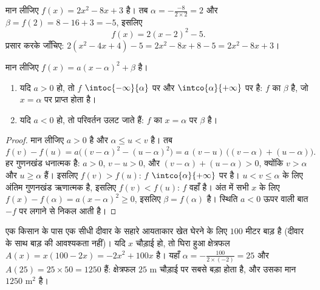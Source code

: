 \begin{example}\label{ex:g11:quad:canonical}
मान लीजिए $f(x) = 2x^2 - 8x + 3$ है। तब $\alpha = -\frac{-8}{2 \times 2} = 2$ और $\beta = f(2) = 8 - 16 + 3 = -5$, इसलिए
\[
f(x) = 2(x - 2)^2 - 5 .
\]
प्रसार करके जाँचिए: $2(x^2 - 4x + 4) - 5 = 2x^2 - 8x + 8 - 5 =
2x^2 - 8x + 3$।
\end{example}

\begin{proposition}[चरम मान और परिवर्तन]\label{prop:g11:quad:variations}
मान लीजिए $f(x) = a(x-\alpha)^2 + \beta$ है।
\begin{enumerate}
  \item यदि $a > 0$ हो, तो $f$ $\intoc{-\infty}{\alpha}$ पर  और $\intco{\alpha}{+\infty}$ पर  है: $f$
        का \emph{} $\beta$ है, जो $x = \alpha$ पर प्राप्त होता है।
  \item यदि $a < 0$ हो, तो परिवर्तन उलट जाते हैं: $f$ का $x = \alpha$ पर
        \emph{} $\beta$ है।
\end{enumerate}
\end{proposition}

\begin{proof}
मान लीजिए $a > 0$ है और $\alpha \leq u < v$ है। तब
\[
f(v) - f(u) = a\bigl((v-\alpha)^2 - (u-\alpha)^2\bigr)
= a\,(v - u)\,\bigl((v-\alpha) + (u-\alpha)\bigr).
\]
हर गुणनखंड धनात्मक है: $a > 0$, $v - u > 0$, और $(v-\alpha) + (u-\alpha) > 0$, क्योंकि $v > \alpha$ और $u \geq \alpha$ हैं।
इसलिए $f(v) > f(u)$: $f$ $\intco{\alpha}{+\infty}$ पर  है। $u < v \leq \alpha$ के लिए अंतिम गुणनखंड ऋणात्मक है,
इसलिए $f(v) < f(u)$: $f$ वहाँ  है। अंत में सभी $x$ के लिए $f(x) - f(\alpha) = a(x-\alpha)^2 \geq 0$, इसलिए $\beta = f(\alpha)$
 है। स्थिति $a < 0$ ऊपर वाली बात $-f$ पर लगाने से निकल आती है।
\end{proof}

\begin{example}
एक किसान के पास एक सीधी दीवार के सहारे आयताकार खेत घेरने के लिए $100$ मीटर
बाड़ है (दीवार के साथ बाड़ की आवश्यकता नहीं)। यदि $x$ चौड़ाई हो, तो घिरा
हुआ क्षेत्रफल $A(x) = x(100 - 2x) = -2x^2 + 100x$ है। यहाँ $\alpha =
-\frac{100}{2\times(-2)} = 25$ और $A(25) = 25 \times 50 = 1250$ हैं: क्षेत्रफल $25$ m चौड़ाई पर
सबसे बड़ा होता है, और उसका मान $1250$ m$^2$ है।
\end{example}

